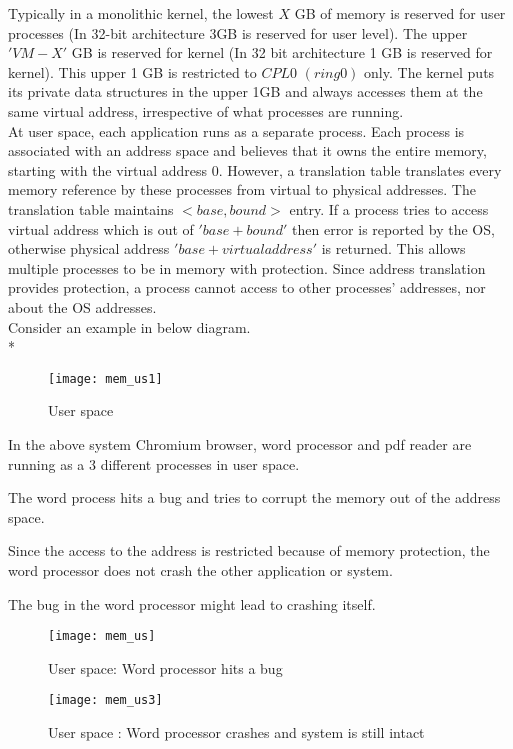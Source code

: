 Typically in a monolithic kernel, the lowest $X$ GB of memory is reserved for user processes (In 32-bit architecture 3GB is reserved for user level). The upper $'VM - X'$ GB is reserved for kernel (In 32 bit architecture 1 GB is reserved for kernel). This upper 1 GB is restricted to $CPL 0$ $(ring 0)$ only. The kernel puts its private data structures in the upper 1GB and always accesses them at the same virtual address, irrespective of what processes are running. 
\\
At user space, each application runs as a separate process. Each process is associated with an address space and believes that it owns the entire memory, starting with the virtual address 0.
However, a translation table translates every memory reference by these processes from virtual to physical addresses. The translation table maintains $<base, bound>$ entry. If a process tries to access virtual address which is out of $'base + bound'$ then error is reported by the OS, otherwise physical address $'base + virtual address'$ is returned. This allows multiple processes to be in memory with protection. Since address translation provides protection, a process cannot access to other processes’ addresses, nor about the OS addresses.
\\
Consider an example in below diagram.
\\*
\begin{figure}[!ht]
\centering
\texttt{[image: mem\_us1]}
\caption{User space}
\label{fig:User space}
\end{figure}
\begin{description}
\item In the above system Chromium browser, word processor and pdf reader are running as a 3 different processes in user space.
\item The word process hits a bug and tries to corrupt the memory out of the address space.
\item Since the access to the address is restricted because of memory protection, the word processor does not crash the other application or system.
\item The bug in the word processor might lead to crashing itself.
\end{description}
\begin{figure}[!ht]
\centering
\texttt{[image: mem\_us]}
\caption{User space: Word processor hits a bug}
\label{fig:User space}
\end{figure}
\begin{figure}[!ht]
\centering
\texttt{[image: mem\_us3]}
\caption{User space : Word processor crashes and system is still intact}
\label{fig:User space}
\end{figure}

